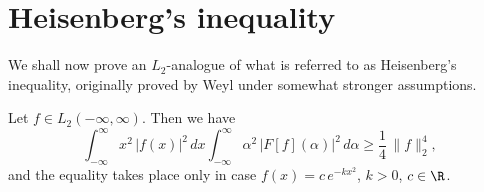 \setcounter{section}{4}
\section{Heisenberg's inequality}
\label{sec:II-5}

We shall now prove an $L_{2}$-analogue of what is referred to as Heisenberg's inequality, originally proved by Weyl under somewhat stronger assumptions.

\begin{theorem}\label{thm:II-8}
Let $f\in L_{2}(-\infty,\infty)$. Then we have
\begin{equation}\tag{5.1}\label{eq:II-5.1}
\int_{-\infty}^{\infty}x^{2}\,|f(x)|^{2}\,dx
\int_{-\infty}^{\infty}\alpha^{2}\,|F[f](\alpha)|^{2}\,d\alpha
\ge \frac{1}{4}\,\|f\|_{2}^{4},
\end{equation}
and the equality takes place only in case $f(x)=c\,e^{-kx^{2}}$, $k>0$, $c\in\R$.
\end{theorem}
